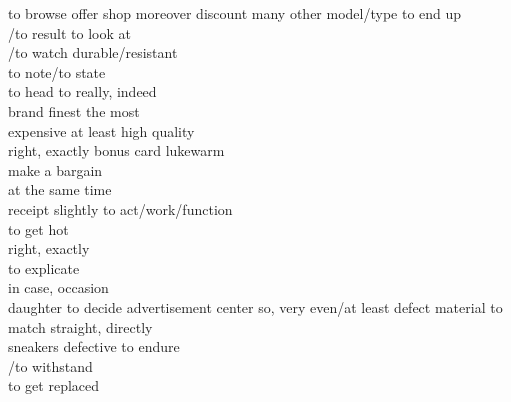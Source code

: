 \documentclass[addpoints,a4paper,11pt]{exam}
\begin{document}
  \begin{questions}
    \begin{multicols}{3}
      \raggedcolumns
      \question to browse \fillin
      \question offer \fillin
      \question shop \fillin
      \question moreover \fillin
      \question discount \fillin
      \question many \fillin
      \question other \fillin
      \question model/type \fillin
      \question to end up\\/to result \fillin
      \question to look at\\/to watch \fillin
      \question durable/resistant \\\fillin
      \question to note/to state \\\fillin
      \question to head to \fillin
      \question really, indeed \\\fillin
      \question brand \fillin
      \question finest \fillin
      \question the most\\expensive \fillin
      \question at least \fillin
      \question high quality \\\fillin
      \question right, exactly \fillin
      \question bonus card \fillin
      \question lukewarm \\ \fillin
      \question make a bargain \\ \fillin
      \question at the same time \\ \fillin
      \question receipt \fillin
      \question slightly \fillin
      \question to act/work/function \\ \fillin
      \question to get hot \\ \fillin
      \question right, exactly \\ \fillin
      \question to explicate \\ \fillin
      \question in case, occasion \\ \fillin
      \question daughter \fillin
      \question to decide \fillin
      \question advertisement \fillin
      \question center \fillin
      \question so, very \fillin
      \question even/at least \fillin[][0.5in]
      \question defect \fillin
      \question material \fillin
      \question to match \fillin
      \question straight, directly \\\fillin[][0.8in]
      \question sneakers \fillin
      \question defective \fillin
      \question to endure\\/to withstand \\\fillin
      \question to get replaced\\ \fillin[][0.8in]

\end{multicols}
\end{questions}
\end{document}
